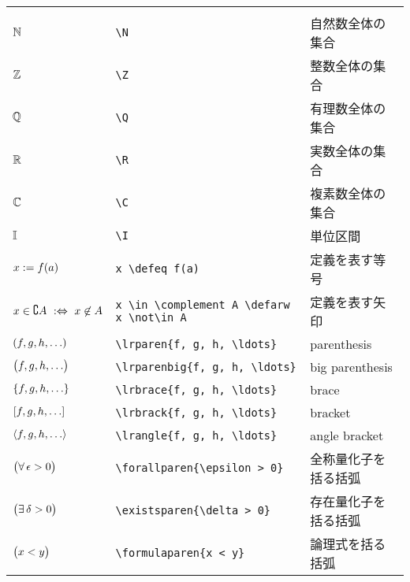 \documentclass[uplatex, dvipdfmx, 12pt, crop=false]{standalone}
\begin{document}
\begin{table}[htb]
\begin{tabular}{ll@{\qquad}l}
		\tablesubtitle{基礎的な数式記号} \\
		$\mathbb{N}$                                      & \verb|\N|                                      & 自然数全体の集合     \\
		$\mathbb{Z}$                                      & \verb|\Z|                                      & 整数全体の集合       \\
		$\mathbb{Q}$                                      & \verb|\Q|                                      & 有理数全体の集合     \\
		$\mathbb{R}$                                      & \verb|\R|                                      & 実数全体の集合       \\
		$\mathbb{C}$                                      & \verb|\C|                                      & 複素数全体の集合     \\
		$\mathbb{I}$                                      & \verb|\I|                                      & 単位区間             \\
		$x \mathrel{:=} f(a)$                           & \verb|x \defeq f(a)|                           & 定義を表す等号       \\
		$x \in \complement A \mathrel{\ :\Leftrightarrow\ } x \not\in A$ & \verb|x \in \complement A \defarw x \not\in A| & 定義を表す矢印       \\
		$\lrparen{f, g, h, \ldots}$               & \verb|\lrparen{f, g, h, \ldots}|               & parenthesis          \\
		$\bigl({f, g, h, \ldots}\bigr)$            & \verb|\lrparenbig{f, g, h, \ldots}|            & big parenthesis      \\
		$\lrbrace{f, g, h, \ldots}$               & \verb|\lrbrace{f, g, h, \ldots}|               & brace                \\
		$\lrbrack{f, g, h, \ldots}$               & \verb|\lrbrack{f, g, h, \ldots}|               & bracket              \\
		$\lrangle{f, g, h, \ldots}$               & \verb|\lrangle{f, g, h, \ldots}|               & angle bracket        \\
		$\bigl({\forall\, \epsilon > 0}\bigr)$              & \verb|\forallparen{\epsilon > 0}|              & 全称量化子を括る括弧 \\
		$\bigl({\exists\, \delta > 0}\bigr)$                & \verb|\existsparen{\delta > 0}|                & 存在量化子を括る括弧 \\
		$\bigl({x < y}\bigr)$                    & \verb|\formulaparen{x < y}|                    & 論理式を括る括弧     \\

\end{tabular}
\end{table}
\end{document}
